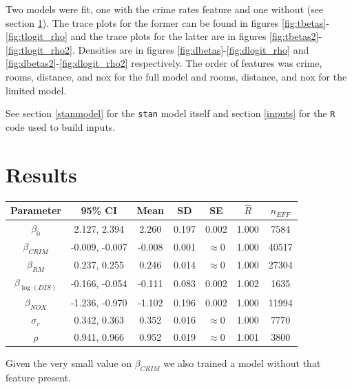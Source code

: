 \documentclass[11pt]{article}
\newcommand{\code}[1]{\colorbox{light-gray}{\texttt{#1}}}
\begin{document}
Two models were fit, one with the crime rates feature and one without (see section \ref{results}). The trace plots for the former can be found in figures \ref{fig:tbetas}-\ref{fig:tlogit_rho} and the trace plots for the latter are in figures \ref{fig:tbetas2}-\ref{fig:tlogit_rho2}. Densities are in figures \ref{fig:dbetas}-\ref{fig:dlogit_rho} and \ref{fig:dbetas2}-\ref{fig:dlogit_rho2} respectively. The order of features was crime, rooms, distance, and nox for the full model and rooms, distance, and nox for the limited model. \newline

See section \ref{stanmodel} for the \code{stan} model itself and section \ref{inputs} for the \code{R} code used to build inputs. 


\section{Results} \label{results}


\begin{center}
\begin{tabular}{ c  | c | c | c | c | c | c}
\hline
 Parameter & 95\% CI & Mean & SD & SE & $\hat{R}$ & $n_{EFF}$ \\ 
 \hline
 $\beta_0$ & 2.127, 2.394 & 2.260 & 0.197 & 0.002 & 1.000 & 7584 \\
 $\beta_{CRIM}$ & -0.009, -0.007 & -0.008 & 0.001 & $\approx 0$ & 1.000 & 40517  \\
 $\beta_{RM}$ & 0.237, 0.255 & 0.246 & 0.014 & $\approx 0$  & 1.000 & 27304 \\
 $\beta_{\log{(DIS)}}$ & -0.166, -0.054 & -0.111 & 0.083 & 0.002 & 1.002 & 1635 \\
 $\beta_{NOX}$ & -1.236, -0.970 & -1.102 & 0.196 & 0.002 & 1.000 & 11994 \\
 $\sigma_r$ & 0.342, 0.363 & 0.352 & 0.016 & $\approx 0$ & 1.000 & 7770 \\
$\rho$ & 0.941, 0.966 & 0.952 & 0.019 & $\approx 0$ & 1.001 & 3800 \\
\hline
\end{tabular}
\end{center}

Given the very small value on $\beta_{CRIM}$ we also trained a model without that feature present. 
\end{document}
